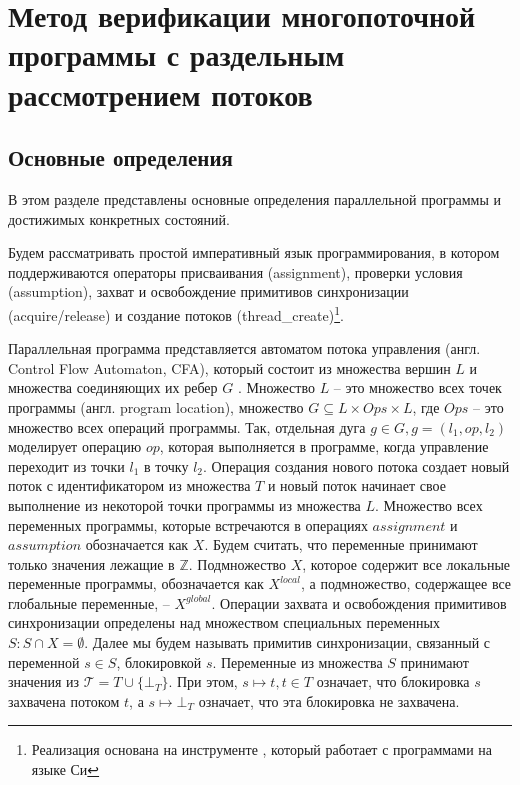 \newcommand{\epp}{\mathrel{\bigoplus}}

\chapter{Метод верификации многопоточной программы с раздельным рассмотрением потоков}
\label{chapter_theory}

\section{Основные определения}
В этом разделе представлены основные определения параллельной программы и достижимых конкретных состояний.

Будем рассматривать простой императивный язык программирования, в котором поддерживаются операторы присваивания (assignment), проверки условия (assumption), захват и освобождение примитивов синхронизации (acquire/release) и создание потоков (thread\_create)\footnote{Реализация основана на инструменте \cpachecker, который работает с программами на языке Си}.

Параллельная программа представляется автоматом потока управления (англ. Control Flow Automaton, CFA), который состоит из множества вершин $L$  и множества соединяющих их ребер $G$ .
Множество $L$ -- это множество всех точек программы (англ. program location), множество $G \subseteq L \times Ops \times L$, где $Ops$ -- это множество всех операций программы.
Так, отдельная дуга $g \in G, g = (l_1, op, l_2)$ моделирует операцию $op$, которая выполняется в программе, когда управление переходит из точки $l_1$ в точку $l_2$.
Операция создания нового потока создает новый поток с идентификатором из множества $T$ и новый поток начинает свое выполнение из некоторой точки программы из множества $L$.
Множество всех переменных программы, которые встречаются в операциях $assignment$ и $assumption$ обозначается как $X$.
Будем считать, что переменные принимают только значения лежащие в $\mathbb{Z}$.
Подмножество $X$, которое содержит все локальные переменные программы, обозначается как $X^{local}$, а подмножество, содержащее все глобальные переменные, --  $X^{global}$. 
Операции захвата и освобождения примитивов синхронизации определены над множеством специальных переменных $S: S \cap X = \emptyset$.
Далее мы будем называть примитив синхронизации, связанный с переменной $s \in S$, блокировкой $s$.
Переменные из множества $S$ принимают значения из $\mathcal{T}=T \cup \{\bot_T\}$.
При этом, $s \mapsto t, t \in T$ означает, что блокировка $s$ захвачена потоком $t$, а $s \mapsto \bot_T$ означает, что эта блокировка не захвачена.

